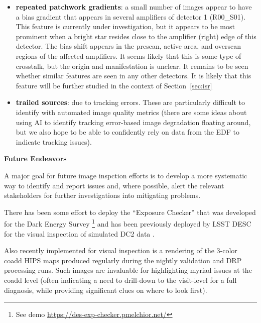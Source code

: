 \begin{itemize}
\item \textbf{repeated patchwork gradients}: a small number of images appear to have a 
  bias gradient that appears in several amplifiers of detector 1 (R00\_S01). This feature 
  is currently under investigation, but it appears to be most prominent when a bright star 
  resides close to the amplifier (right) edge of this detector. The bias shift appears in 
  the prescan, active area, and overscan regions of the affected amplifiers. It seems 
  likely that this is some type of crosstalk, but the origin and manifestation is unclear. 
  It remains to be seen whether similar features are seen in any other detectors. It is 
  likely that this feature will be further studied in the context of Section~\ref{sec:isr}

\item \textbf{trailed sources}: due to tracking errors.  These are particularly
  difficult to identify with automated image quality metrics (there are some ideas
  about using AI to identify tracking error-based image degradation floating around,
  but we also hope to be able to confidently rely on data from the EDF to indicate
  tracking issues).

\end{itemize}

\noindent \textbf{Future Endeavors}

A major goal for future image inspction efforts is to develop a more systematic
way to identify and report issues and, where possible, alert the
relevant stakeholders for further investigations into mitigating problems.

There has been some effort to deploy the ``Exposure Checker'' that was developed for the Dark Energy Survey \citep{2016A&C....16...99M}\footnote{See demo \url{https://des-exp-checker.pmelchior.net/}} and has been previously deployed by LSST DESC for the visual inspection of simulated DC2 data \citep{2021ApJS..253...31L}.

Also recently implemented for visual inspection is a rendering of the 3-color coadd
HIPS maps produced regularly during the nightly validation and DRP processing runs.
Such images are invaluable for highlighting myriad issues at the coadd level (often
indicating a need to drill-down to the visit-level for a full diagnosis, while
providing significant clues on where to look first).
